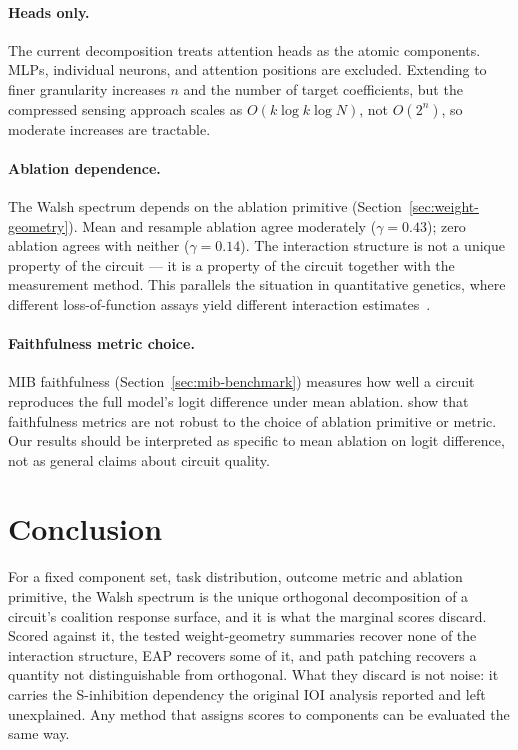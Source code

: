 \documentclass{article}
\begin{document}
\paragraph{Heads only.}

The current decomposition treats attention heads as the atomic
components. MLPs, individual neurons, and attention positions are
excluded. Extending to finer granularity increases $n$ and the number
of target coefficients, but the compressed sensing approach scales
as $O(k \log k \log N)$, not $O(2^n)$, so moderate increases are
tractable.

\paragraph{Ablation dependence.}

The Walsh spectrum depends on the ablation primitive
(Section~\ref{sec:weight-geometry}). Mean and resample ablation agree
moderately ($\gamma = 0.43$); zero ablation agrees with neither
($\gamma = 0.14$). The interaction structure is not a unique property
of the circuit --- it is a property of the circuit together with the
measurement method. This parallels the situation in quantitative
genetics, where different loss-of-function assays yield different
interaction
estimates~\citep{housden2017comparison,fluidity2024elife}.

\paragraph{Faithfulness metric choice.}

MIB faithfulness (Section~\ref{sec:mib-benchmark}) measures how well a
circuit reproduces the full model's logit difference under mean ablation.
\citet{miller2024transformer} show that faithfulness metrics are not
robust to the choice of ablation primitive or metric. Our results should
be interpreted as specific to mean ablation on logit difference, not as
general claims about circuit quality.



\section{Conclusion}
\label{sec:conclusion}

For a fixed component set, task distribution, outcome metric and ablation primitive, the Walsh
spectrum is the unique orthogonal decomposition of a circuit's coalition response surface, and it
is what the marginal scores discard. Scored against it, the tested weight-geometry summaries recover
none of the interaction structure, EAP recovers some of it, and path patching recovers a quantity
not distinguishable from orthogonal. What they discard is not noise: it carries the S-inhibition
dependency the original IOI analysis reported and left unexplained. Any method that assigns scores
to components can be evaluated the same way.
\end{document}
